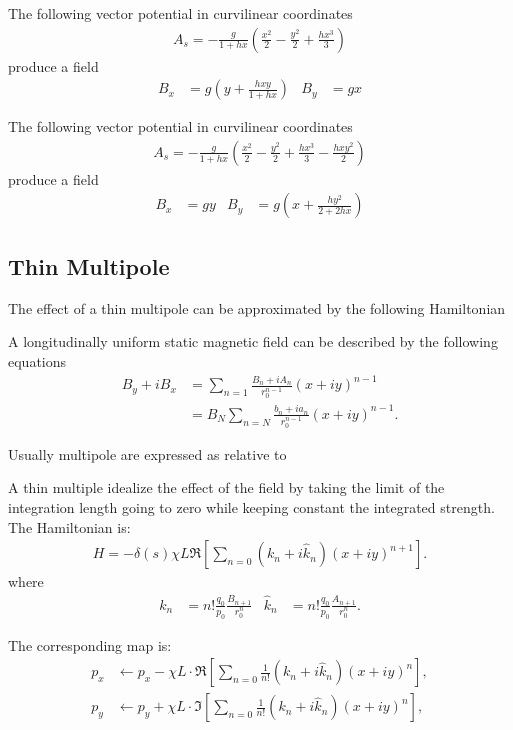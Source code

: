 The following vector potential in curvilinear coordinates
\begin{align}
A_s= -\frac{g}{1+h x}
    \left(\frac{x^2}{2} - \frac{y^2}{2} +
          \frac{h x^3}{3} \right)
\end{align}
produce a field 
\begin{align}
B_x&= g \left(y + \frac{h x y}{1+h x} \right) &
B_y&= g x 
\end{align}

The following vector potential in curvilinear coordinates
\begin{align}
A_s= -\frac{g}{1+h x}
    \left(\frac{x^2}{2} - \frac{y^2}{2} +
          \frac{h x^3}{3} -   \frac{h x y^2}{2} \right)
\end{align}
produce a field 
\begin{align}
B_x&= g y &
B_y&= g \left(x + \frac{h y^2}{2+2 h x} \right) 
\end{align}


\subsection{Thin Multipole}

The effect of a thin multipole can be approximated by the following Hamiltonian

A longitudinally uniform static magnetic field can be described by the following equations
\begin{align}
    B_y+iB_x&=\sum_{n=1}     \frac{B_n+iA_n}{r_0^{n-1}} (x+iy)^{n-1} \\
            &=B_N \sum_{n=N} \frac{b_n+ia_n}{r_0^{n-1}} (x+iy)^{n-1}  .
\end{align}

Usually multipole are expressed as relative to 

A thin multiple idealize the effect of the field by taking the limit of the integration 
length going to zero while keeping constant the integrated strength. The Hamiltonian is:
\begin{align}
  H=- \delta(s) \chi L \Re\left[\sum_{n=0} (k_n + i\hat k_n) (x+iy)^{n+1} \right].
\end{align}
where
\begin{align}
  k_n     &=  n!\frac{q_0}{p_0}  \frac{B_{n+1}}{r_0^n}  &
  \hat k_n&=  n!\frac{q_0}{p_0}  \frac{A_{n+1}}{r_0^n} .
\end{align}


The corresponding map is:
\begin{align}
  p_x &\leftarrow p_x - \chi L\cdot\Re\left[\sum_{n=0} \frac{1}{n!} (k_n + i\hat k_n) (x+iy)^n \right], \\
  p_y &\leftarrow p_y + \chi L\cdot\Im\left[\sum_{n=0} \frac{1}{n!} (k_n + i\hat k_n) (x+iy)^n \right],
\end{align}

